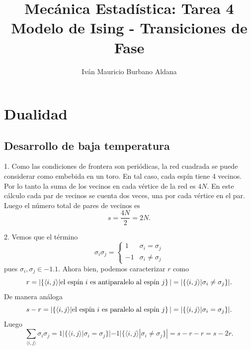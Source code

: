 \documentclass{article}
\title{Mecánica Estadística: Tarea 4\\ Modelo de Ising - Transiciones de Fase}
\author{Iván Mauricio Burbano Aldana}
\begin{document}
\maketitle

\section{Dualidad}

\subsection{Desarrollo de baja temperatura}

1. Como las condiciones de frontera son periódicas, la red cuadrada se puede considerar como embebida en un toro. En tal caso, cada espín tiene 4 vecinos. Por lo tanto la suma de los vecinos en cada vértice de la red es $4N$. En este cálculo cada par de vecinos se cuenta dos veces, una por cada vértice en el par. Luego el número total de pares de vecinos es
\begin{equation}
s=\frac{4N}{2}=2N.
\end{equation}

2. Vemos que el término
\begin{equation}
\sigma_i\sigma_j=\begin{cases}
1 & \sigma_i=\sigma_j \\
-1 & \sigma_i\neq\sigma_j
\end{cases}
\end{equation}
pues $\sigma_i,\sigma_j\in\qty{-1,1}$. Ahora bien, podemos caracterizar $r$ como
\begin{equation}
r=|\qty{\langle i,j\rangle|\text{el espín $i$ es antiparalelo al espín $j$}}|=|\{\langle i,j\rangle|\sigma_i\neq\sigma_j\}|.
\end{equation}
De manera análoga
\begin{equation}
s-r=|\qty{\langle i,j\rangle|\text{el espín $i$ es paralelo al espín $j$}}|=|\{\langle i,j\rangle|\sigma_i=\sigma_j\}|.
\end{equation}
Luego
\begin{equation}
\sum_{\langle i,j\rangle}\sigma_i\sigma_j=1|\{\langle i,j\rangle|\sigma_i=\sigma_j\}|-1|\{\langle i,j\rangle|\sigma_i\neq\sigma_j\}|=s-r-r=s-2r.
\end{equation}
\end{document}
